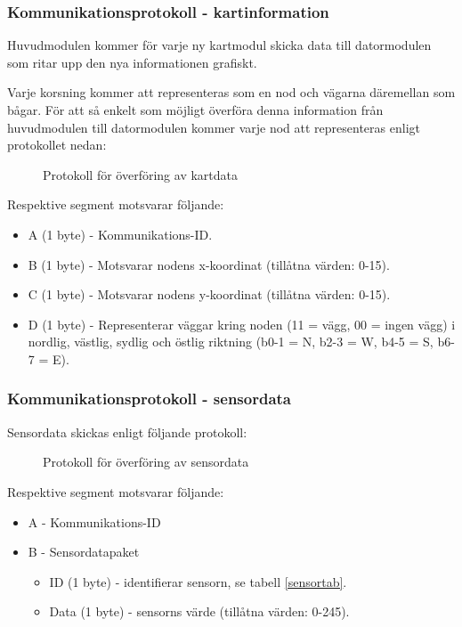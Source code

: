 \documentclass[11pt]{article}
\begin{document}
\begin{flushleft}
\subsubsection{Kommunikationsprotokoll - kartinformation}
Huvudmodulen kommer för varje ny kartmodul skicka data till datormodulen som ritar upp den nya informationen grafiskt. 

Varje korsning kommer att representeras som en nod och vägarna däremellan som bågar. För att så enkelt som möjligt överföra denna information från huvudmodulen till datormodulen kommer varje nod att representeras enligt protokollet nedan:

 \begin{figure}[H]
\centering
\noindent\resizebox{.8\linewidth}{!}{
	}
	\caption{Protokoll för överföring av kartdata \label{kartdata}}	
\end{figure} 

Respektive segment motsvarar följande: 
\begin{itemize}
	\item A (1 byte) - Kommunikations-ID.
	\item B (1 byte) - Motsvarar nodens x-koordinat (tillåtna värden: 0-15).
	\item C (1 byte) - Motsvarar nodens y-koordinat (tillåtna värden: 0-15).
	\item D (1 byte) - Representerar väggar kring noden (11 = vägg, 00 = ingen vägg) i nordlig, västlig, sydlig och östlig riktning (b0-1 = N, b2-3 = W, b4-5 = S, b6-7 = E).
\end{itemize}

\subsubsection{Kommunikationsprotokoll - sensordata}
Sensordata skickas enligt följande protokoll:

 \begin{figure}[H]
\centering
\noindent\resizebox{.8\linewidth}{!}{
	}
	\caption{Protokoll för överföring av sensordata\label{sensordata}}	
\end{figure} 

Respektive segment motsvarar följande: 
\begin{itemize}
	\item A - Kommunikations-ID
	\item B - Sensordatapaket
	\begin{itemize}
	\item ID (1 byte) - identifierar sensorn, se tabell \ref{sensortab}.
	\item Data (1 byte) - sensorns värde (tillåtna värden: 0-245).
	\end{itemize}
\end{itemize}


\end{flushleft}
\end{document}
